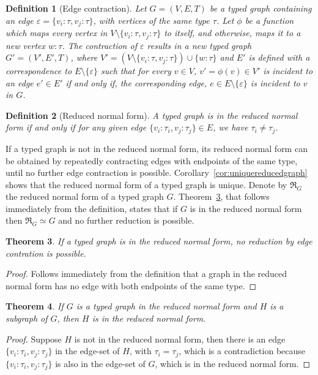 \documentclass[preprint,12pt]{elsarticle}
\theoremstyle{plain}
\newtheorem{theorem}{Theorem}[section]
\newtheorem{definition}[theorem]{Definition}
\newcommand\tyv[2]{#1\!\!:\!\!#2}
\newcommand\subgraph{\subseteq}
\begin{document}
\begin{definition}[Edge contraction]
Let $G = (V,E,T)$ be a typed graph
containing an edge $\varepsilon=\{\tyv{v_i}{\tau}, \tyv{v_j}{\tau}\}$,
with vertices of the same type $\tau$.
Let $\phi$ be a function which maps every vertex in $V\setminus\{\tyv{v_i}{\tau}, \tyv{v_j}{\tau}\}$ to itself, and otherwise,
maps it to a new vertex $\tyv{w}{\tau}$.
The contraction of $\varepsilon$ results in a new typed graph
$G'=(V',E',T)$,
where $V'=(V\setminus\{\tyv{v_i}{\tau}, \tyv{v_j}{\tau}\})\cup\{\tyv{w}{\tau}\}$ and $E'$ is defined with a correspondence to $E\setminus\{\varepsilon\}$ such that
for every $v\in V$, $v'=\phi(v)\in V'$ is incident to an edge $e'\in E'$ if and only if, the corresponding edge, $e\in E\setminus\{\varepsilon\}$ is incident to $v$ in $G$.
\end{definition}

\begin{definition}[Reduced normal form]
A typed graph is in the reduced normal form if and only if for any given edge $\{\tyv{v_i}{\tau_i}, \tyv{v_j}{\tau_j}\}\in E$,
we have $\tau_i \neq \tau_j$.
\end{definition}

If a typed graph is not in the reduced normal form, its reduced normal form can be obtained by
repeatedly contracting edges with endpoints of the same type, until no further 
edge contraction is possible.
Corollary~\ref{cor:uniquereducedgraph} shows that the reduced normal form of a typed graph is unique.
Denote by $\Re_G$ the reduced normal form of a typed graph $G$.
Theorem~\ref{theorem:noreduction}, that follows immediately from the definition,
states that if $G$ is in the reduced normal form then $\Re_G\simeq G$
and no further reduction is possible.

\begin{theorem}\label{theorem:noreduction}
If a typed graph is in the reduced normal form,
no reduction by edge contration is possible.
\end{theorem}
\begin{proof}
Follows immediately from the definition that
a graph in the reduced normal form has no
edge with both endpoints of the same type.
\end{proof}

\begin{theorem}\label{theorem:reducedsubgraph}
If $G$ is a typed graph in the reduced normal form
and $H$ is a subgraph of $G$, then
$H$ is in the reduced normal form.
\end{theorem}
\begin{proof}
Suppose $H$ is not in the reduced normal form, then there is
an edge $\{\tyv{v_i}{\tau_i}, \tyv{v_j}{\tau_j}\}$ in the edge-set of $H$,
with $\tau_i=\tau_j$, which is a contradiction because $\{\tyv{v_i}{\tau_i}, \tyv{v_j}{\tau_j}\}$
is also in the edge-set of $G$, which is in the reduced normal form.
\end{proof}
\end{document}
